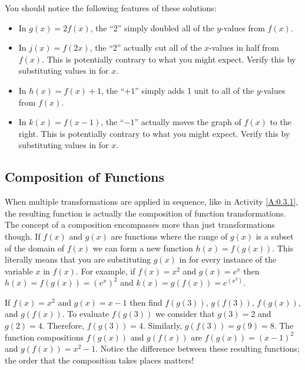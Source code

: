You should notice the following features of these solutions:
\begin{itemize}
    \item In $g(x)=2f(x)$, the ``2'' simply doubled all of the $y$-values from $f(x)$.  
    \item In $j(x)=f(2x)$, the ``2'' actually cut all of the $x$-values in half from $f(x)$.
        This is potentially contrary to what you might expect. Verify this by substituting
        values in for $x$.
    \item In $h(x)=f(x)+1$, the ``$+1$'' simply adds 1 unit to all of the $y$-values from
        $f(x)$.
    \item In $k(x)=f(x-1)$, the ``$-1$'' actually moves the graph of $f(x)$ to the right.
        This is potentially contrary to what you might expect. Verify this by substituting
        values in for $x$.
\end{itemize}
\afterex






\subsection*{Composition of Functions}
When multiple transformations are applied in sequence, like in Activity \ref{A:0.3.1}, the
resulting function is actually the composition of function transformations.  The
concept of a composition encompasses more than just transformations though.  If $f(x)$ and
$g(x)$ are functions where the range of $g(x)$ is a subset of the domain of $f(x)$ we can
form a new function $h(x) = f(g(x))$. This literally means that you are substituting
$g(x)$ in for every instance of the variable $x$ in $f(x)$.  For example, if $f(x) = x^2$
and $g(x) = e^x$ then $h(x) = f(g(x)) = \left( e^x \right)^2$ and $k(x) = g(f(x)) =
e^{(x^2)}$.  

\bex
If $f(x) = x^2$ and $g(x) = x-1$ then find $f(g(3))$, $g(f(3))$, $f(g(x))$, and
$g(f(x))$.
\eex
To evaluate $f(g(3))$ we consider that $g(3) = 2$ and $g(2) = 4$.  Therefore, $f(g(3))=4$.
Similarly, $g(f(3)) = g(9) = 8$.  The function compositions $f(g(x))$ and $g(f(x))$ are
$f(g(x)) = (x-1)^2$ and $g(f(x))=x^2 - 1$.  Notice the difference between these resulting
functions; the order that the composition takes places matters!
\afterex



